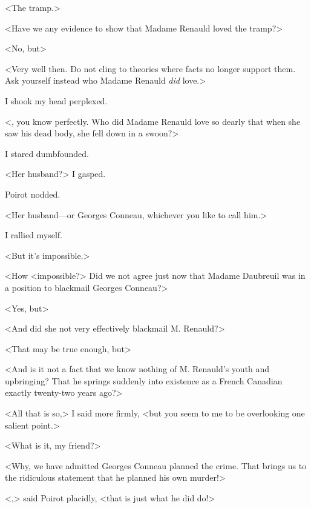  <The tramp.> 

 <Have we any evidence to show that Madame Renauld loved the tramp?> 

 <No, but\longdash> 

 <Very well then. Do not cling to theories where facts no longer support them. Ask yourself instead who Madame Renauld \emph{did} love.> 

 I shook my head perplexed. 

 <, you know perfectly. Who did Madame Renauld love so dearly that when she saw his dead body, she fell down in a swoon?> 

 I stared dumbfounded. 

 <Her husband?> I gasped. 

 Poirot nodded. 

 <Her husband—or Georges Conneau, whichever you like to call him.> 

 I rallied myself. 

 <But it's impossible.> 

 <How <impossible?> Did we not agree just now that Madame Daubreuil was in a position to blackmail Georges Conneau?> 

 <Yes, but\longdash> 

 <And did she not very effectively blackmail M. Renauld?> 

 <That may be true enough, but\longdash> 

 <And is it not a fact that we know nothing of M. Renauld's youth and upbringing? That he springs suddenly into existence as a French Canadian exactly twenty-two years ago?> 

 <All that is so,> I said more firmly, <but you seem to me to be overlooking one salient point.> 

 <What is it, my friend?> 

 <Why, we have admitted Georges Conneau planned the crime. That brings us to the ridiculous statement that he planned his own murder!> 

 <,> said Poirot placidly, <that is just what he did do!>